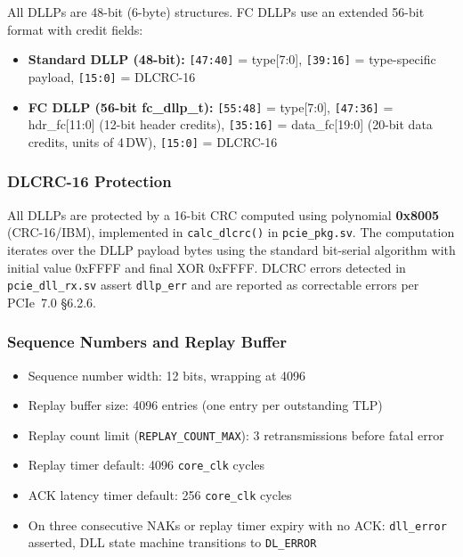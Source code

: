 \documentclass[11pt,a4paper]{article}
\begin{document}
All DLLPs are 48-bit (6-byte) structures. FC DLLPs use an extended 56-bit format
with credit fields:

\begin{itemize}[noitemsep]
  \item \textbf{Standard DLLP (48-bit):} \texttt{[47:40]} = type[7:0], \texttt{[39:16]} = type-specific payload, \texttt{[15:0]} = DLCRC-16
  \item \textbf{FC DLLP (56-bit fc\_dllp\_t):} \texttt{[55:48]} = type[7:0], \texttt{[47:36]} = hdr\_fc[11:0] (12-bit header credits), \texttt{[35:16]} = data\_fc[19:0] (20-bit data credits, units of 4\,DW), \texttt{[15:0]} = DLCRC-16
\end{itemize}

\subsubsection{DLCRC-16 Protection}

All DLLPs are protected by a 16-bit CRC computed using polynomial \textbf{0x8005}
(CRC-16/IBM), implemented in \texttt{calc\_dlcrc()} in \texttt{pcie\_pkg.sv}.
The computation iterates over the DLLP payload bytes using the standard bit-serial
algorithm with initial value 0xFFFF and final XOR 0xFFFF. DLCRC errors detected
in \texttt{pcie\_dll\_rx.sv} assert \texttt{dllp\_err} and are reported as
correctable errors per PCIe~7.0 \S6.2.6.

\subsubsection{Sequence Numbers and Replay Buffer}

\begin{itemize}[noitemsep]
  \item Sequence number width: 12 bits, wrapping at 4096
  \item Replay buffer size: 4096 entries (one entry per outstanding TLP)
  \item Replay count limit (\texttt{REPLAY\_COUNT\_MAX}): 3 retransmissions before fatal error
  \item Replay timer default: 4096 \texttt{core\_clk} cycles
  \item ACK latency timer default: 256 \texttt{core\_clk} cycles
  \item On three consecutive NAKs or replay timer expiry with no ACK: \texttt{dll\_error} asserted, DLL state machine transitions to \texttt{DL\_ERROR}
\end{itemize}
\end{document}
